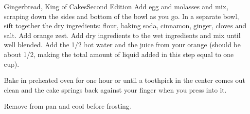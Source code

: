 \begin{entry}{Gingerbread, King of Cakes}{Second Edition}
Add egg and molasses and mix, scraping down the sides and bottom of the bowl as
you go. In a separate bowl, sift together the dry ingredients: flour, baking
soda, cinnamon, ginger, cloves and salt. Add orange zest. Add dry ingredients to
the wet ingredients and mix until well blended. Add the \SI{1/2}{\cup} hot water
and the juice from your orange (should be about \SI{1/2}{\cup}, making the total
amount of liquid added in this step equal to one cup).

Bake in preheated oven for one hour or until a toothpick in the center comes out
clean and the cake springs back against your finger when you press into it.

Remove from pan and cool before frosting.
\end{entry}

